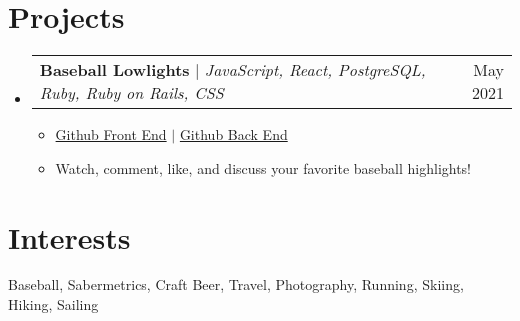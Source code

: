 \documentclass[letterpaper,11pt]{article}
\makeatletter
\newcommand{\resumeItem}[1]{
  \item\small{
    {#1 \vspace{-2pt}}
  }
}
\newcommand{\resumeProjectHeading}[2]{
    \item
    \begin{tabular*}{0.97\textwidth}{l@{\extracolsep{\fill}}r}
      \small#1 & #2 \\
    \end{tabular*}\vspace{-7pt}
}
\newcommand{\resumeSubHeadingListStart}{\begin{itemize}[leftmargin=0.15in, label={}]}
\newcommand{\resumeSubHeadingListEnd}{\end{itemize}}
\newcommand{\resumeItemListStart}{\begin{itemize}}
\newcommand{\resumeItemListEnd}{\end{itemize}\vspace{-5pt}}
\makeatother
\begin{document}
\section{Projects}
    \resumeSubHeadingListStart
      \resumeProjectHeading
          {\textbf{Baseball Lowlights} $|$ \emph{JavaScript, React, PostgreSQL, Ruby, Ruby on Rails, CSS}}{May 2021}
          \resumeItemListStart
            \resumeItem{\href{https://github.com/coltenappleby/Baseball-Lowlights-FE}{Github Front End} $|$  \href{https://github.com/coltenappleby/Baseball-Lowlights-BE}{Github Back End}}
            \resumeItem{Watch, comment, like, and discuss your favorite baseball highlights!}
          \resumeItemListEnd
    \resumeSubHeadingListEnd

\section{Interests}
\begin{itemize}[leftmargin=0.15in, label={}]
   \small{\item{
    {Baseball, Sabermetrics, Craft Beer, Travel, Photography, Running, Skiing, Hiking, Sailing} \\
   }}
\end{itemize}


\end{document}
